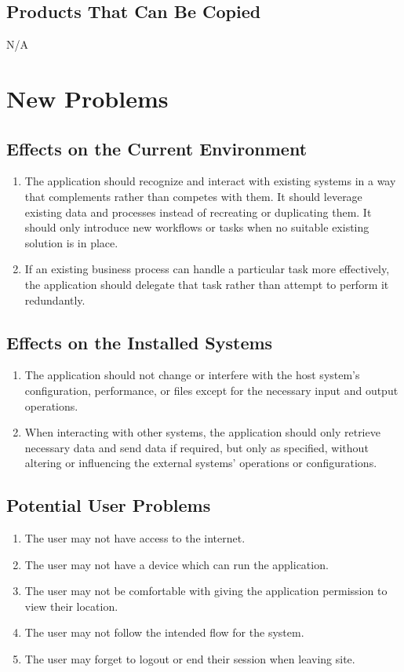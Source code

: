 \documentclass[12pt]{article}
\begin{document}
\subsection{Products That Can Be Copied}
N/A

\section{New Problems}
\subsection{Effects on the Current Environment}
\begin{enumerate}
  \item The application should recognize and interact with existing
    systems in a way that complements rather than competes with them.
    It should leverage existing data and processes instead of
    recreating or duplicating them.
    It should only introduce new workflows or tasks when no suitable
    existing solution is in place.
  \item If an existing business process can handle a particular task
    more effectively, the application should delegate that task
    rather than attempt to perform it redundantly.
\end{enumerate}
\subsection{Effects on the Installed Systems}
\begin{enumerate}
  \item The application should not change or interfere with the host
    system's configuration, performance, or files except for the
    necessary input and output operations.
  \item When interacting with other systems, the application should
    only retrieve necessary data and send data if required, but only
    as specified, without altering or influencing the external
    systems' operations or configurations.
\end{enumerate}
\subsection{Potential User Problems}
\begin{enumerate}
  \item The user may not have access to the internet.
  \item The user may not have a device which can run the application.
  \item The user may not be comfortable with giving the application
    permission to view their location.
  \item The user may not follow the intended flow for the system.
  \item The user may forget to logout or end their session when leaving site.
\end{enumerate}
\end{document}
